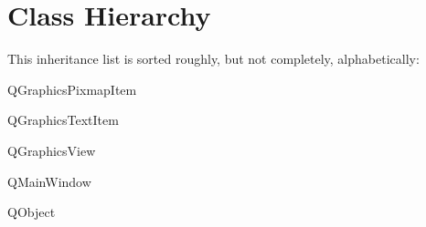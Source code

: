 \section{Class Hierarchy}
This inheritance list is sorted roughly, but not completely, alphabetically\+:\begin{DoxyCompactList}
\item Q\+Graphics\+Pixmap\+Item\begin{DoxyCompactList}
\item {}
\item {}
\item {}
\end{DoxyCompactList}
\item Q\+Graphics\+Text\+Item\begin{DoxyCompactList}
\item {}
\item {}
\item {}
\end{DoxyCompactList}
\item Q\+Graphics\+View\begin{DoxyCompactList}
\item {}
\end{DoxyCompactList}
\item Q\+Main\+Window\begin{DoxyCompactList}
\item {}
\end{DoxyCompactList}
\item Q\+Object\begin{DoxyCompactList}
\item {}
\item {}
\item {}
\end{DoxyCompactList}
\end{DoxyCompactList}
